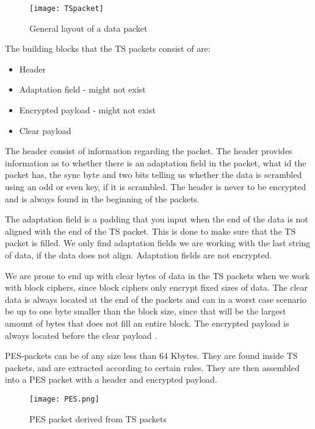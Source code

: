 \begin{figure}
\texttt{[image: TSpacket]}
\caption{General layout of a data packet \citep{DVB:2013}}
\label{img:Package}
\end{figure}

The building blocks that the TS packets consist of are:

\begin{itemize}
\item Header
\item Adaptation field - might not exist
\item Encrypted payload - might not exist
\item Clear payload
\end{itemize}

The header consist of information regarding the packet. The header provides 
information as to whether there is an adaptation field in the packet, what id 
the packet has, the sync byte and two bits telling us whether the data is 
scrambled using an odd or even key, if it is scrambled. The header is never to 
be encrypted and is always found in the beginning of the packets.

The adaptation field is a padding that you input when the end of the data is not 
aligned with the end of the TS packet. This is done to make sure that the TS 
packet is filled. We only find adaptation fields we are working with the last 
string of data, if the data does not align. Adaptation fields are not encrypted.

We are prone to end up with clear bytes of data in the TS packets when we work 
with block ciphers, since block ciphers only encrypt fixed sizes of data. The 
clear data is always located at the end of the packets and can in a worst case 
scenario be up to one byte smaller than the block size, since that will be the 
largest amount of bytes that does not fill an entire block. The encrypted 
payload is always located before  the clear 
payload \cite[pp. 10--11]{DVB:2013}.

PES-packets can be of any size less than 64 Kbytes. They are found inside TS 
packets, and are extracted according to certain rules.  They are then assembled into a PES packet 
with a header and encrypted payload.

\begin{figure}
  \texttt{[image: PES.png]}
  \label{img:PES}
  \caption{PES packet derived from TS packets}
\end{figure}

